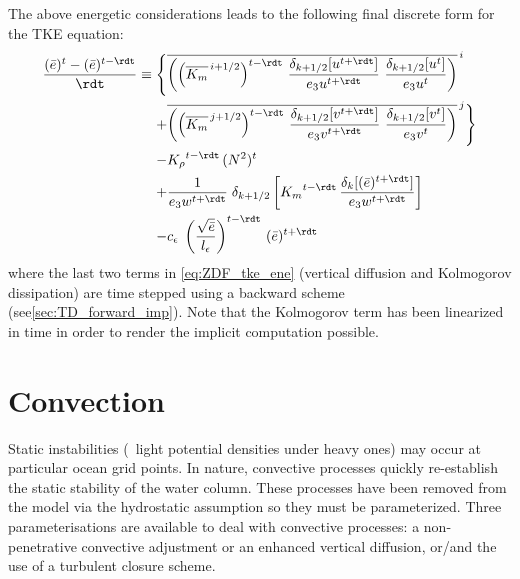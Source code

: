 \documentclass[../main/NEMO_manual]{subfiles}
\begin{document}
The above energetic considerations leads to the following final discrete form for the TKE equation:
\begin{equation}
  \label{eq:ZDF_tke_ene}
  \begin{split}
    \frac { (\bar{e})^t - (\bar{e})^{t-\rdt} } {\rdt}  \equiv
    \Biggl\{ \Biggr.
    &\overline{ \left( \left(\overline{K_m}^{\,i+1/2}\right)^{t-\rdt} \,\frac{\delta_{k+1/2}[u^{t+\rdt}]}{{e_3u}^{t+\rdt} }
        \ \frac{\delta_{k+1/2}[u^ t         ]}{{e_3u}^ t          }  \right) }^{\,i} \\
    +&\overline{  \left( \left(\overline{K_m}^{\,j+1/2}\right)^{t-\rdt} \,\frac{\delta_{k+1/2}[v^{t+\rdt}]}{{e_3v}^{t+\rdt} }
        \ \frac{\delta_{k+1/2}[v^ t         ]}{{e_3v}^ t          }  \right) }^{\,j}
    \Biggr. \Biggr\}   \\
    - &{K_\rho}^{t-\rdt}\,{(N^2)^t}    \\
    +&\frac{1}{{e_3w}^{t+\rdt}}  \;\delta_{k+1/2} \left[   {K_m}^{t-\rdt} \,\frac{\delta_{k}[(\bar{e})^{t+\rdt}]} {{e_3w}^{t+\rdt}}   \right]   \\
    - &c_\epsilon \; \left( \frac{\sqrt{\bar {e}}}{l_\epsilon}\right)^{t-\rdt}\,(\bar {e})^{t+\rdt}
  \end{split}
\end{equation}
where the last two terms in \autoref{eq:ZDF_tke_ene} (vertical diffusion and Kolmogorov dissipation)
are time stepped using a backward scheme (see\autoref{sec:TD_forward_imp}).
Note that the Kolmogorov term has been linearized in time in order to render the implicit computation possible.

\section{Convection}
\label{sec:ZDF_conv}

Static instabilities (\ie\ light potential densities under heavy ones) may occur at particular ocean grid points.
In nature, convective processes quickly re-establish the static stability of the water column.
These processes have been removed from the model via the hydrostatic assumption so they must be parameterized.
Three parameterisations are available to deal with convective processes:
a non-penetrative convective adjustment or an enhanced vertical diffusion,
or/and the use of a turbulent closure scheme.
\end{document}
